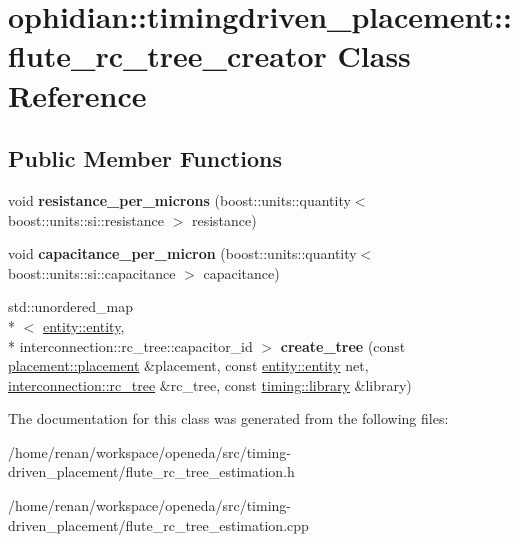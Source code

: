 \hypertarget{classophidian_1_1timingdriven__placement_1_1flute__rc__tree__creator}{\section{ophidian\-:\-:timingdriven\-\_\-placement\-:\-:flute\-\_\-rc\-\_\-tree\-\_\-creator Class Reference}
\label{classophidian_1_1timingdriven__placement_1_1flute__rc__tree__creator}
}
\subsection*{Public Member Functions}
\begin{DoxyCompactItemize}
\item 
\hypertarget{classophidian_1_1timingdriven__placement_1_1flute__rc__tree__creator_a83535cfa2b8c12154515584aeb6bff6e}{void {\bfseries resistance\-\_\-per\-\_\-microns} (boost\-::units\-::quantity$<$ boost\-::units\-::si\-::resistance $>$ resistance)}\label{classophidian_1_1timingdriven__placement_1_1flute__rc__tree__creator_a83535cfa2b8c12154515584aeb6bff6e}

\item 
\hypertarget{classophidian_1_1timingdriven__placement_1_1flute__rc__tree__creator_a8f7b73a96e1f6e98bf4b5f045c541b9c}{void {\bfseries capacitance\-\_\-per\-\_\-micron} (boost\-::units\-::quantity$<$ boost\-::units\-::si\-::capacitance $>$ capacitance)}\label{classophidian_1_1timingdriven__placement_1_1flute__rc__tree__creator_a8f7b73a96e1f6e98bf4b5f045c541b9c}

\item 
\hypertarget{classophidian_1_1timingdriven__placement_1_1flute__rc__tree__creator_a3fc2dbc9e66b5c33132f774045bbd065}{std\-::unordered\-\_\-map\\*
$<$ \hyperlink{classophidian_1_1entity_1_1entity}{entity\-::entity}, \\*
interconnection\-::rc\-\_\-tree\-::capacitor\-\_\-id $>$ {\bfseries create\-\_\-tree} (const \hyperlink{classophidian_1_1placement_1_1placement}{placement\-::placement} \&placement, const \hyperlink{classophidian_1_1entity_1_1entity}{entity\-::entity} net, \hyperlink{classophidian_1_1interconnection_1_1rc__tree}{interconnection\-::rc\-\_\-tree} \&rc\-\_\-tree, const \hyperlink{classophidian_1_1timing_1_1library}{timing\-::library} \&library)}\label{classophidian_1_1timingdriven__placement_1_1flute__rc__tree__creator_a3fc2dbc9e66b5c33132f774045bbd065}

\end{DoxyCompactItemize}


The documentation for this class was generated from the following files\-:\begin{DoxyCompactItemize}
\item 
/home/renan/workspace/openeda/src/timing-\/driven\-\_\-placement/flute\-\_\-rc\-\_\-tree\-\_\-estimation.\-h\item 
/home/renan/workspace/openeda/src/timing-\/driven\-\_\-placement/flute\-\_\-rc\-\_\-tree\-\_\-estimation.\-cpp\end{DoxyCompactItemize}
